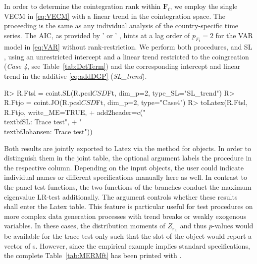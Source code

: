 In order to determine the cointegration rank within $ \boldsymbol{F}_{t} $, we employ the single VECM in \eqref{eq:VECM} with a linear trend in the cointegration space. The proceeding is the same as any individual analysis of the country-specific time series. The AIC, as provided by '  or ' , hints at a lag order of $ p_{F_t}=2 $ for the VAR model in \eqref{eq:VAR} without rank-restriction.
We perform both procedures, \citet{Johansen1996} and SL \citeyearpar{SaikkonenLutkepohl2000c}, using an unrestricted intercept and a linear trend restricted to the coingreation (\textit{Case 4}, see Table~\ref{tab:DetTerm}) and the corresponding intercept and linear trend in the additive \eqref{eq:addDGP} (\textit{SL\_trend}).
\begin{CodeChunk}
\begin{CodeInput}
R> R.Ftsl = coint.SL(R.pcsl$CSD$Ft, dim_p=2, type_SL="SL_trend")
R> R.Ftjo = coint.JO(R.pcsl$CSD$Ft, dim_p=2, type="Case4")
R> toLatex(R.Ftsl, R.Ftjo, write_ME=TRUE, 
+     add2header=c("\\textbf{SL:} Trace test", 
+                  "\\textbf{Johansen:} Trace test"))
\end{CodeInput}
\end{CodeChunk}
Both results are jointly exported to Latex via the  method for  objects. In order to distinguish them in the joint table, the optional argument  labels the procedure in the respective column. Depending on the input  objects, the user could indicate individual names or different specifications manually here as well. In contrast to the panel test functions, the two functions of the  branches conduct the maximum eigenvalue LR-test additionally. The argument  controls whether these results shall enter the Latex table. This feature is particular useful for test procedures on more complex data generation processes with trend breaks or weakly exogenous variables. In these cases, the distribution moments of $ Z_{r_\perp} $ and thus $p$-values would be available for the trace test only such that the slot  of the  object would report a vector of s. However, since the empirical example implies standard specifications, the complete Table~\ref{tab:MERMft} has been printed with .
 
